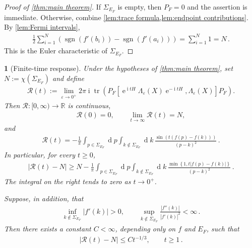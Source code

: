 \documentclass[a4paper,10pt]{article}
\numberwithin{equation}{section}
\theoremstyle{plain}
\theoremstyle{plain}
\theoremstyle{plain}
\theoremstyle{plain}
\newtheorem{prop}[thm]{\protect\propositionname}
\theoremstyle{plain}
\theoremstyle{remark}
\theoremstyle{definition}
\theoremstyle{plain}
\providecommand{\propositionname}{Proposition}
\newcommand{\ee}{\operatorname{e}}
\newcommand{\ii}{\operatorname{i}}
\newcommand{\RR}{\mathbb{R}}
\newcommand{\calR}{\mathcal{R}}
\newcommand{\dif}{\operatorname{d}\!} %
\newcommand{\tr}{\operatorname{tr}}
\newcommand{\ve}{\varepsilon}
\newcommand{\sgn}{\operatorname{sgn}}
\newcommand{\eq}[1]{\begin{align*}#1\end{align*}}
\newcommand{\eql}[1]{\begin{align}#1\end{align}}
\begin{document}
\begin{proof}[Proof of \cref{thm:main theorem}]
If $\Sigma_{E_F}$ is empty, then $P_F=0$ and the assertion is immediate. Otherwise, combine \cref{lem:trace formula,lem:endpoint contributions}. By \cref{lem:Fermi intervals},
\eq{\frac{1}{2}\sum_{i=1}^{N}\left(\sgn(f'(b_i))-\sgn(f'(a_i))\right)=\sum_{i=1}^{N}1=N\,.}
This is the Euler characteristic of $\Sigma_{E_F}$.
\end{proof}
\begin{prop}[Finite-time response]\label{prop:finite-time response}
Under the hypotheses of \cref{thm:main theorem}, set
$N:=\chi(\Sigma_{E_F})$ and define
\eql{\calR(t):=
\lim_{\ve\to0^+}
2\pi\ii\tr\left(
P_F\left[
\ee^{\ii tH}\Lambda_\ve(X)\ee^{-\ii tH},
\Lambda_\ve(X)
\right]P_F
\right).
\label{eq:finite-time response}}
Then $\calR:[0,\infty)\to\RR$ is continuous,
\eq{\calR(0)=0,\qquad \lim_{t\to\infty}\calR(t)=N,}
and
\eq{\calR(t)
=
-\frac{1}{\pi}
\int_{p\in\Sigma_{E_F}}\dif{p}
\int_{k\notin\Sigma_{E_F}}\dif{k}\,
\frac{\sin\left(t(f(p)-f(k))\right)}{(p-k)^2}\,.}
In particular, for every $t\geq0$,
\eq{\left|\calR(t)-N\right|
\geq
N-\frac{1}{\pi}
\int_{p\in\Sigma_{E_F}}\dif{p}
\int_{k\notin\Sigma_{E_F}}\dif{k}\,
\frac{
\min\left\{1,t|f(p)-f(k)|\right\}
}{(p-k)^2}\,.}
The integral on the right tends to zero as $t\to0^+$.

Suppose, in addition, that
\eq{\inf_{k\notin\Sigma_{E_F}}|f'(k)|>0,
\qquad
\sup_{k\notin\Sigma_{E_F}}
\frac{|f''(k)|}{|f'(k)|^2}<\infty\,.}
Then there exists a constant $C<\infty$, depending only on $f$ and $E_F$,
such that
\eq{\left|\calR(t)-N\right|\leq Ct^{-1/3},
\qquad t\geq1\,.}
\end{prop}
\end{document}
